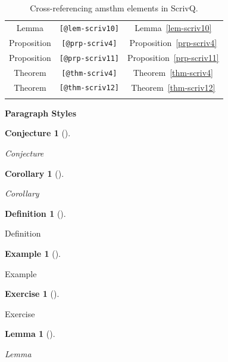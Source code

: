 \documentclass[
  12pt,
  a4paper,
  oneside,
  numbers=noenddot,
  titlepage,
  toclink=all,
  toc=bibliography]{scrbook}
\theoremstyle{definition}
\newtheorem{exercise}{Exercise}[section]
\theoremstyle{definition}
\newtheorem{example}{Example}[section]
\theoremstyle{definition}
\newtheorem{definition}{Definition}[section]
\theoremstyle{plain}
\newtheorem{conjecture}{Conjecture}[section]
\theoremstyle{plain}
\newtheorem{corollary}{Corollary}[section]
\theoremstyle{plain}
\theoremstyle{plain}
\theoremstyle{plain}
\newtheorem{lemma}{Lemma}[section]
\theoremstyle{remark}
\begin{document}
\begin{longtable}[]{@{}ccc@{}}
Lemma & \texttt{{[}@lem-scriv10{]}} &
\protect\hypertarget{cite_62}{}{\label{cite_62}Lemma~\ref{lem-scriv10}} \\
Proposition & \texttt{{[}@prp-scriv4{]}} &
\protect\hypertarget{cite_63}{}{\label{cite_63}Proposition~\ref{prp-scriv4}} \\
Proposition & \texttt{{[}@prp-scriv11{]}} &
\protect\hypertarget{cite_64}{}{\label{cite_64}Proposition~\ref{prp-scriv11}} \\
Theorem & \texttt{{[}@thm-scriv4{]}} &
\protect\hypertarget{cite_65}{}{\label{cite_65}Theorem~\ref{thm-scriv4}} \\
Theorem & \texttt{{[}@thm-scriv12{]}} &
\protect\hypertarget{cite_66}{}{\label{cite_66}Theorem~\ref{thm-scriv12}} \\
\caption{\label{tbl-scriv4}Cross-referencing amsthm elements in
ScrivQ.}\tabularnewline
\end{longtable}

\textbf{Paragraph Styles}

\begin{conjecture}[]\protect\hypertarget{cnj-scriv4}{}\label{cnj-scriv4}

Conjecture

\end{conjecture}

\begin{corollary}[]\protect\hypertarget{cor-scriv4}{}\label{cor-scriv4}

Corollary

\end{corollary}

\begin{definition}[]\protect\hypertarget{def-scriv4}{}\label{def-scriv4}

Definition

\end{definition}

\begin{example}[]\protect\hypertarget{exm-scriv4}{}\label{exm-scriv4}

Example

\end{example}

\begin{exercise}[]\protect\hypertarget{exr-scriv4}{}\label{exr-scriv4}

Exercise

\end{exercise}

\begin{lemma}[]\protect\hypertarget{lem-scriv4}{}\label{lem-scriv4}

Lemma

\end{lemma}
\end{document}
